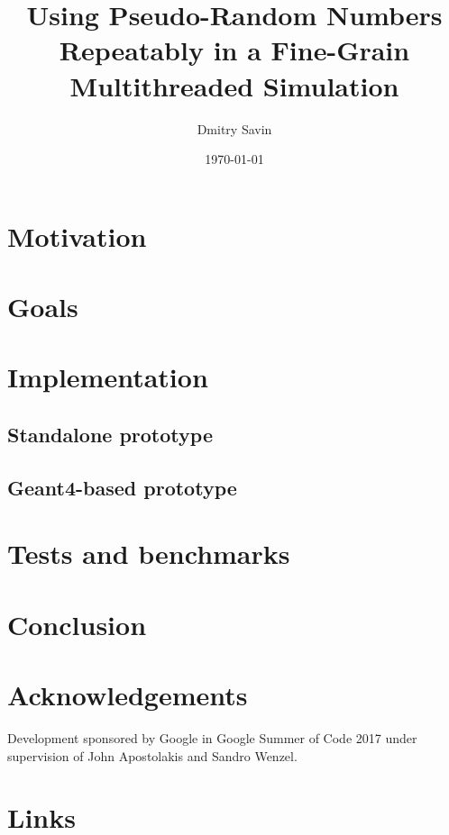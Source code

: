 \documentclass[a4paper, 12pt]{article} %
\title{Using Pseudo-Random Numbers Repeatably in a Fine-Grain Multithreaded Simulation}
\author{Dmitry Savin}
\date{\today}
\begin{document}
 \maketitle

 \section*{Motivation}
 
 \section*{Goals}
  
 \section*{Implementation}
 
  \subsection*{Standalone prototype}
 
  \subsection*{Geant4-based prototype}
  
 \section*{Tests and benchmarks}
 
 \section*{Conclusion}
 
 \section*{Acknowledgements}
  Development sponsored by Google in Google Summer of Code 2017 under supervision of John Apostolakis and Sandro Wenzel.
 
 \section*{Links}
 
%  
%  
 
\end{document}
